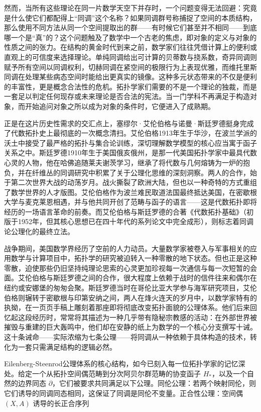 \documentclass[12pt,a4paper]{article}
\begin{document}
然而，当所有这些理论在同一片数学天空下并存时，一个问题变得无法回避：究竟是什么使它们都配得上“同调”这个名称？如果同调群号称捕捉了空间的本质结构，那么使用不同方法从同一个空间提取出的群——有时候它们甚至并不相同——到底哪一个是“真”的？这个问题触及了数学中一个古老的焦虑，即对象的定义与对象的性质之间的张力。在结构的黄金时代到来之前，数学家们往往凭借计算上的便利或直观上的可信度来选择理论。单纯同调给出可计算的贝蒂数与挠系数，奇异同调则赋予所有空间以同调权利，切赫同调在紧空间的极限行为上表现优雅，而维托里斯同调在处理某些病态空间时能给出更真实的镜像。这种多元状态带来的不仅是便利的丰富性，更是概念合法性的危机。拓扑学家们需要的不是一个理论的独裁，而是一套足以判定任何现存或未来理论是否合法的宪法。当一门学科不再满足于构造对象，而开始追问对象之所以成为对象的条件时，它便进入了成熟期。

正是在这片历史性需求的交汇点上，塞缪尔·艾伦伯格与诺曼·斯廷罗德挺身完成了代数拓扑史上最彻底的一次概念清扫。艾伦伯格1913年生于华沙，在波兰学派的沃土中接受了最严格的拓扑与集合论训练，深切理解数学模型的核心应当寓于函子关系之中。斯廷罗德1910年生于美国俄亥俄州，是那一代美国拓扑学家中最具代数心灵的人物，他在哈佛追随莱夫谢茨学习，继承了将代数与几何熔铸为一炉的抱负，并在纤维丛的同调研究中积累了关于公理化思维的深刻洞察。两人的合作，始于第二次世界大战的动荡岁月。战火撕裂了欧洲大陆，但也以一种奇特的方式重组了数学世界的人才版图。艾伦伯格作为波兰难民取道法国最终抵达美国，在密歇根大学与麦克莱恩相遇，并与他共同开创了范畴与函子的语言——这是代数拓扑即将经历的一场语言革命的前奏。而艾伦伯格与斯廷罗德的合著《代数拓扑基础》（初版于1952年，但其核心思想已在四十年代的系列论文中完全成形），则标志着同调论公理化的最终立法。

战争期间，美国数学界经历了空前的人力动员。大量数学家被卷入与军事相关的应用数学与计算项目中，拓扑学的研究被迫转入一种零散的地下状态。但也正是这种零散，迫使那些仍旧坚持纯理论思索的心灵更加珍视每一次通信与每一次短暂的会面。艾伦伯格与斯廷罗德之间的合作，很大程度上依赖于战时的信件往来和偶尔在纽约或安娜堡的匆匆会聚。斯廷罗德当时在哥伦比亚大学参与海军研究项目，艾伦伯格则辗转于密歇根与印第安纳之间，两人在烽火连天的岁月中，以数学家特有的执拗，在一页页手稿上雕刻着那座即将彻底改变拓扑面貌的公理体系。他们后来回忆起这段经历时，常常将其描述为一种几乎带有隐秘宗教感的活动：在外部世界被摧毁与重建的巨大轰鸣中，他们却在安静的纸上为数学的一个核心分支撰写十诫。这十条诫命——实际浓缩为七条公理——将同调从一种依赖于具体构造的技术，转化为一套只需满足结构的逻辑必然。

Eilenberg-Steenrod公理体系的核心结构，如今已刻入每一位拓扑学家的记忆深处。给定一个从拓扑空间偶范畴到分次阿贝尔群范畴的协变函子 $H_*$，以及一个自然的边界同态 $\partial$，它们被要求共同满足以下公理。同伦公理：若两个映射同伦，则它们诱导的同调同态相同，这保证了同调是同伦不变量。正合性公理：空间偶 $(X,A)$ 诱导的长正合序列
\end{document}
